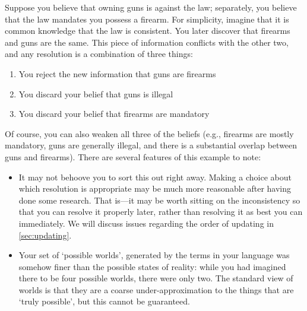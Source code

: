 \documentclass{article}
\begin{document}
	\begin{example}
		Suppose you believe that owning guns is against the law; separately, you believe that the law mandates you possess a firearm. For simplicity, imagine that it is common knowledge that the law is consistent. You later discover that firearms and guns are the same. This piece of information conflicts with the other two, and any resolution is a combination of three things:
		\begin{enumerate}[nosep]
			\item You reject the new information that guns are firearms 
			\item You discard your belief that guns is illegal
			\item You discard your belief that firearms are mandatory
		\end{enumerate}
		Of course, you can also weaken all three of the beliefs (e.g., firearms are mostly mandatory, guns are generally illegal, and there is a substantial overlap between guns and firearms). There are several features of this example to note:
		
		\begin{itemize}
			\item It may not behoove you to sort this out right away. Making a choice about which resolution is appropriate may be much more reasonable after having done some research. That is---it may be worth sitting on the inconsistency so that you can resolve it properly later, rather than resolving it as best you can immediately. We will discuss issues regarding the order of updating in \cref{sec:updating}.
			
			\item Your set of `possible worlds', generated by the terms in your language was somehow finer than the possible states of reality: while you had imagined there to be four possible worlds, there were only two. The standard view of worlds is that they are a coarse under-approximation to the things that are `truly possible', but this cannot be guaranteed.
			 
			
		\end{itemize} 
	\end{example}
\end{document}
